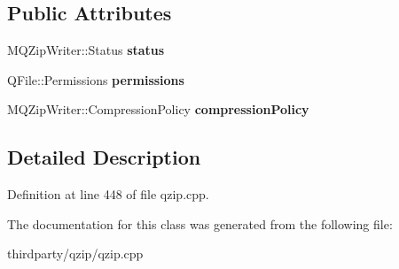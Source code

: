 \subsection*{Public Attributes}
\begin{DoxyCompactItemize}
\item 
\mbox{\label{class_m_q_zip_writer_private_a4bb6ab91aa09093f51bc41c84a63cecd}} 
M\+Q\+Zip\+Writer\+::\+Status {\bfseries status}
\item 
\mbox{\label{class_m_q_zip_writer_private_a5f5c7397f8add828adb712a68cddbfe4}} 
Q\+File\+::\+Permissions {\bfseries permissions}
\item 
\mbox{\label{class_m_q_zip_writer_private_a2282127cdcbdcfdd1f03c00e2b1e8d81}} 
M\+Q\+Zip\+Writer\+::\+Compression\+Policy {\bfseries compression\+Policy}
\end{DoxyCompactItemize}


\subsection{Detailed Description}


Definition at line 448 of file qzip.\+cpp.



The documentation for this class was generated from the following file\+:\begin{DoxyCompactItemize}
\item 
thirdparty/qzip/qzip.\+cpp\end{DoxyCompactItemize}
